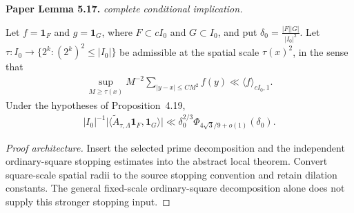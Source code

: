 \begin{lemma}
\label{prime_local_endpoint}
\leanok
\par\medskip\noindent\textbf{Paper Lemma 5.17.} \textit{complete conditional implication.}\par
Let $f=\mathbf1_F$ and $g=\mathbf1_G$, where
$F\subset cI_0$ and $G\subset I_0$, and put $\delta_0=\frac{|F||G|}{|I_0|^2}.$
 Let $\tau:I_0\to\{2^k:(2^k)^2\leq|I_0|\}$ be admissible at the
spatial scale $\tau(x)^2$, in the sense that
\begin{align}
 \sup_{M\geq\tau(x)}M^{-2}
 \sum_{|y-x|\leq CM^2}f(y)
 \ll\langle f\rangle_{cI_0,1}.
\end{align}
Under the hypotheses of Proposition~\textup{4.19},
\begin{align}
 |I_0|^{-1}
 \big|\langle\widetilde A_{\tau,\Lambda}\mathbf1_F,
 \mathbf1_G\rangle\big|
 \ll\delta_0^{2/3}
 \Phi_{4\sqrt3/9+o(1)}(\delta_0).
\end{align}
\end{lemma}
\begin{proof}[Proof architecture]
\leanok
Insert the selected prime decomposition and the independent ordinary-square stopping estimates into the abstract local theorem. Convert square-scale spatial radii to the source stopping convention and retain dilation constants. The general fixed-scale ordinary-square decomposition alone does not supply this stronger stopping input.
\end{proof}

